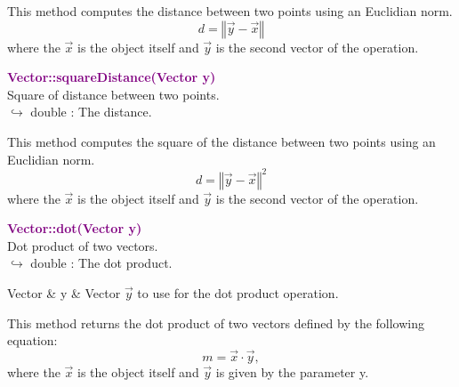 This method computes the distance between two points using an Euclidian norm.
\begin{equation*}
d = \left\Vert \overrightarrow{y} - \overrightarrow{x} \right\Vert
\end{equation*}
where the $\overrightarrow{x}$ is the object itself and $\overrightarrow{y}$ is the second vector of the operation.

\textcolor{purple}{\textbf{Vector::squareDistance(Vector y)}}\label{Vector::squareDistance(Vector y)}\\
Square of distance between two points.\\ \hspace*{10mm}$\hookrightarrow$ double : The distance.

This method computes the square of the distance between two points using an Euclidian norm.
\begin{equation*}
d = {\left\Vert \overrightarrow{y} - \overrightarrow{x} \right\Vert}^2
\end{equation*}
where the $\overrightarrow{x}$ is the object itself and $\overrightarrow{y}$ is the second vector of the operation.

\textcolor{purple}{\textbf{Vector::dot(Vector y)}}\label{Vector::dot(Vector y)}\\
Dot product of two vectors.\\ \hspace*{10mm}$\hookrightarrow$ double : The dot product.

\begin{tcolorbox}[width=\textwidth,myArgs,tabularx={ll|R}]
Vector & y & Vector $\overrightarrow{y}$ to use for the dot product operation.
\end{tcolorbox}

This method returns the dot product of two vectors defined by the following equation:
\begin{equation*}
m = \overrightarrow{x}\cdot\overrightarrow{y},
\end{equation*}
where the $\overrightarrow{x}$ is the object itself and $\overrightarrow{y}$ is given by the parameter y.

